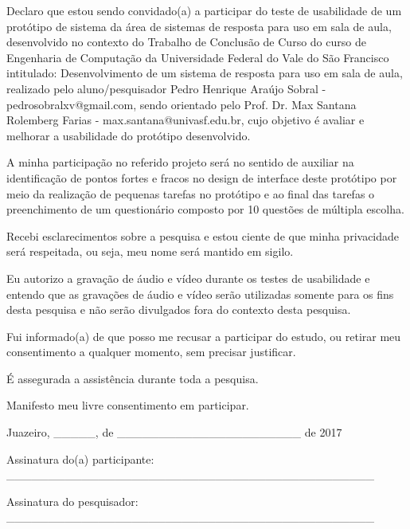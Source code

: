 Declaro que estou sendo convidado(a) a participar do teste de usabilidade de um protótipo de sistema da área de sistemas de resposta para uso em sala de aula, desenvolvido no contexto do Trabalho de Conclusão de Curso do curso de Engenharia de Computação da Universidade Federal do Vale do São Francisco intitulado: Desenvolvimento de um sistema de resposta para uso em sala de aula, realizado pelo aluno/pesquisador Pedro Henrique Araújo Sobral - pedrosobralxv@gmail.com, sendo orientado pelo Prof. Dr. Max Santana Rolemberg Farias - max.santana@univasf.edu.br, cujo objetivo é avaliar e melhorar a usabilidade do protótipo desenvolvido.

A minha participação no referido projeto será no sentido de auxiliar na identificação de pontos fortes e fracos no design de interface deste protótipo por meio da realização de pequenas tarefas no protótipo e ao final das tarefas o preenchimento de um questionário composto por 10 questões de múltipla escolha.

Recebi esclarecimentos sobre a pesquisa e estou ciente de que minha privacidade será respeitada, ou seja, meu nome será mantido em sigilo.

Eu autorizo a gravação de áudio e vídeo durante os testes de usabilidade e entendo que as gravações de áudio e vídeo serão utilizadas somente para os fins desta pesquisa e não serão divulgados fora do contexto desta pesquisa.

Fui informado(a) de que posso me recusar a participar do estudo, ou retirar meu consentimento a qualquer momento, sem precisar justificar.

É assegurada a assistência durante toda a pesquisa.

Manifesto meu livre consentimento em participar.


Juazeiro, _____, de ______________________ de 2017

Assinatura do(a) participante: ____________________________________________

Assinatura do pesquisador: ____________________________________________
